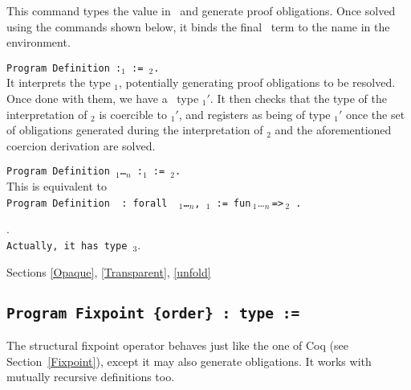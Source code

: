 This command types the value {\term} in \Russell\ and generate proof
obligations. Once solved using the commands shown below, it binds the final
\Coq\ term to the name {\ident} in the environment.

\begin{ErrMsgs}
\item {}
\end{ErrMsgs}

\begin{Variants}
\item {\tt Program Definition {\ident} {\tt :}{\term$_1$} :=
    {\term$_2$}.}\\
  It interprets the type {\term$_1$}, potentially generating proof
  obligations to be resolved. Once done with them, we have a \Coq\ type
  {\term$_1'$}. It then checks that the type of the interpretation of
  {\term$_2$} is coercible to {\term$_1'$}, and registers {\ident} as
  being of type {\term$_1'$} once the set of obligations generated
  during the interpretation of {\term$_2$} and the aforementioned
  coercion derivation are solved.
\item {\tt Program Definition {\ident} {\binder$_1$}\ldots{\binder$_n$}
       {\tt :}\term$_1$ {\tt :=} {\term$_2$}.}\\
  This is equivalent to \\
   {\tt Program Definition\,{\ident}\,{\tt :\,forall}\,%
       {\binder$_1$}\ldots{\binder$_n$}{\tt ,}\,\term$_1$\,{\tt :=}}\,%
       {\tt fun}\,{\binder$_1$}\ldots{\binder$_n$}\,{\tt =>}\,{\term$_2$}\,%
       {\tt .}
\end{Variants}

\begin{ErrMsgs}
\item {}.\\
    \texttt{Actually, it has type {\term$_3$}}.
\end{ErrMsgs}

\SeeAlso Sections \ref{Opaque}, \ref{Transparent}, \ref{unfold}

\subsection{\tt Program Fixpoint {\ident} {\params} {\tt \{order\}} : type := \term
  \label{ProgramFixpoint}}

The structural fixpoint operator behaves just like the one of Coq
(see Section~\ref{Fixpoint}), except it may also generate obligations.
It works with mutually recursive definitions too.

